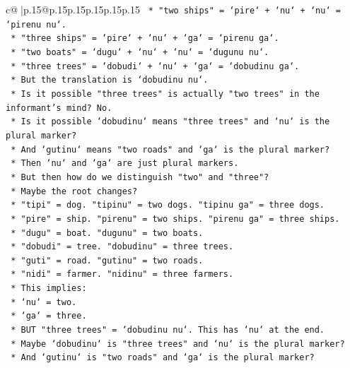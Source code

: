 \documentclass{article}
\begin{document}
{\begin{supertabular}{c@{$\;$}|p{.15\linewidth}@{}p{.15\linewidth}p{.15\linewidth}p{.15\linewidth}p{.15\linewidth}p{.15\linewidth}}
{{{\texttt{            *   "two ships" = `pire` + `nu` + `nu` = `pirenu nu`.} \\
\texttt{            *   "three ships" = `pire` + `nu` + `ga` = `pirenu ga`.} \\
\texttt{            *   "two boats" = `dugu` + `nu` + `nu` = `dugunu nu`.} \\
\texttt{            *   "three trees" = `dobudi` + `nu` + `ga` = `dobudinu ga`.} \\
\texttt{            *   But the translation is `dobudinu nu`.} \\
\texttt{            *   Is it possible "three trees" is actually "two trees" in the informant's mind? No.} \\
\texttt{            *   Is it possible `dobudinu` means "three trees" and `nu` is the plural marker?} \\
\texttt{            *   And `gutinu` means "two roads" and `ga` is the plural marker?} \\
\texttt{            *   Then `nu` and `ga` are just plural markers.} \\
\texttt{            *   But then how do we distinguish "two" and "three"?} \\
\texttt{            *   Maybe the root changes?} \\
\texttt{            *   "tipi" = dog. "tipinu" = two dogs. "tipinu ga" = three dogs.} \\
\texttt{            *   "pire" = ship. "pirenu" = two ships. "pirenu ga" = three ships.} \\
\texttt{            *   "dugu" = boat. "dugunu" = two boats.} \\
\texttt{            *   "dobudi" = tree. "dobudinu" = three trees.} \\
\texttt{            *   "guti" = road. "gutinu" = two roads.} \\
\texttt{            *   "nidi" = farmer. "nidinu" = three farmers.} \\
\texttt{            *   This implies:} \\
\texttt{                *   `nu` = two.} \\
\texttt{                *   `ga` = three.} \\
\texttt{                *   BUT "three trees" = `dobudinu nu`. This has `nu` at the end.} \\
\texttt{                *   Maybe `dobudinu` is "three trees" and `nu` is the plural marker?} \\
\texttt{                *   And `gutinu` is "two roads" and `ga` is the plural marker?} \\
}}}
\end{supertabular}}
\end{document}
